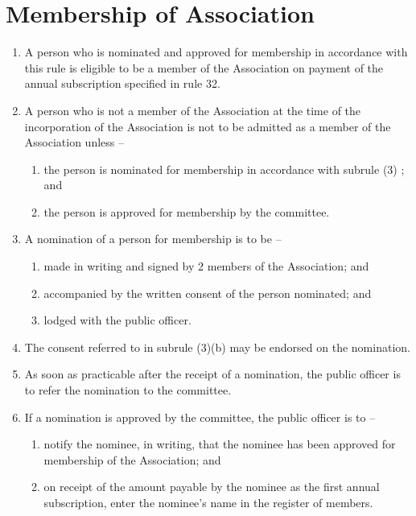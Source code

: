 \documentclass[a4paper,11pt]{article}
\begin{document}
\section{Membership of Association}
\begin{enumerate}
	\item A person who is nominated and approved for membership in accordance with this rule is eligible to be a member of the Association on payment of the annual subscription specified in rule 32.
	
	\item A person who is not a member of the Association at the time of the incorporation of the Association is not to be admitted as a member of the Association unless --
	\begin{enumerate}
		\item the person is nominated for membership in accordance with subrule (3) ; and
		\item the person is approved for membership by the committee.
	\end{enumerate}
	
	\item A nomination of a person for membership is to be --
	\begin{enumerate}
		\item made in writing and signed by 2 members of the Association; and
		\item accompanied by the written consent of the person nominated; and
		\item lodged with the public officer.
	\end{enumerate}
	
	\item The consent referred to in subrule (3)(b) may be endorsed on the nomination.
	\item As soon as practicable after the receipt of a nomination, the public officer is to refer the nomination to the committee.
	
	\item If a nomination is approved by the committee, the public officer is to –
	\begin{enumerate}
		\item notify the nominee, in writing, that the nominee has been approved for membership of the Association; and
		\item on receipt of the amount payable by the nominee as the first annual subscription, enter the nominee's name in the register of members.
	\end{enumerate}
	

\end{enumerate}
\end{document}
